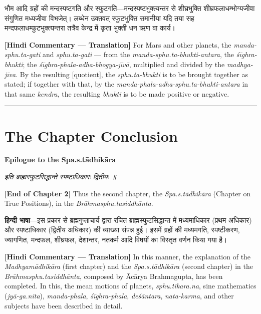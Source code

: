 \documentclass[11pt,a4paper]{book}
\newcommand{\dev}[1]{{\devanagarifont #1}}
\newcommand{\shlokabilingual}[2]{%
  \par\vspace{0.8em}%
  \noindent\begin{minipage}[t]{0.48\textwidth}
    \RaggedRight
    \dev{\textit{#1}}
  \end{minipage}%
  \hfill
  \begin{minipage}[t]{0.48\textwidth}
    \RaggedRight
    #2%
  \end{minipage}%
  \par\vspace{0.8em}%
}
\newcommand{\hindicommbilingual}[2]{%
  \par\vspace{0.5em}%
  \noindent\begin{minipage}[t]{0.48\textwidth}
    \RaggedRight\small
    \dev{#1}
  \end{minipage}%
  \hfill
  \begin{minipage}[t]{0.48\textwidth}
    \RaggedRight\small
    #2%
  \end{minipage}%
  \par\vspace{0.5em}%
}
\newcommand{\ruleheadingbilingual}[2]{%
  \par\vspace{0.8em}%
  \noindent\begin{minipage}[t]{0.48\textwidth}
    \textbf{\color{sectioncolor}\dev{#1}}
  \end{minipage}%
  \hfill
  \begin{minipage}[t]{0.48\textwidth}
    \textbf{\color{sectioncolor}#2}
  \end{minipage}%
  \par\vspace{0.4em}%
}
\newcommand{\secdivider}{%
  \begin{center}\rule{0.4\textwidth}{0.5pt}\end{center}%
}
\begin{document}
\hindicommbilingual{%
भौम आदि ग्रहों की मन्दस्पष्टगति और स्फुटगति---मन्दस्पष्टभुक्त्यन्तर से शीघ्रभुक्ति शीघ्रफलाधम्भोग्यजीवा संगुणित मध्यजीवा विभजेत्‌। लब्धेन उक्तवत्‌ स्फुटभुक्ति समानीया यदि तया सह मन्दफलाधम्फुटभुक्त्यन्तरा तत्रैव केन्द्र में कृता भुक्ती धन ऋण वा कार्य।
}{%
\textbf{[Hindi Commentary --- Translation]} For Mars and other planets, the \textit{manda-sphu.ta-gati} and \textit{sphu.ta-gati} --- from the \textit{manda-sphu.ta-bhukti-antara}, the \textit{śīghra-bhukti}; the \textit{śīghra-phala-adha-bhogya-jīvā}, multiplied and divided by the \textit{madhya-jīva}. By the resulting [quotient], the \textit{sphu.ta-bhukti} is to be brought together as stated; if together with that, by the \textit{manda-phala-adha-sphu.ta-bhukti-antara} in that same \textit{kendra}, the resulting \textit{bhukti} is to be made positive or negative.
}

\secdivider
\clearpage

\section{The Chapter Conclusion}

\ruleheadingbilingual{स्पष्टाधिकारोपसंहारः}{Epilogue to the Spa.s.tādhikāra}

\shlokabilingual{%
इति ब्राह्मस्फुटसिद्धान्ते स्पष्टाधिकारः द्वितीयः ॥
}{%
\textbf{[End of Chapter 2]} Thus the second chapter, the \textit{Spa.s.tādhikāra} (Chapter on True Positions), in the \textit{Brāhmasphu.tasiddhānta}.
}

\hindicommbilingual{%
\textbf{हिन्दी भाषा}---इस प्रकार से ब्रह्मगुप्ताचार्य द्वारा रचित ब्राह्मस्फुटसिद्धान्त में मध्यमाधिकार (प्रथम अधिकार) और स्पष्टाधिकार (द्वितीय अधिकार) की व्याख्या संपन्न हुई। इसमें ग्रहों की मध्यमगति, स्पष्टीकरण, ज्यागणित, मन्दफल, शीघ्रफल, देशान्तर, नतकर्म आदि विषयों का विस्तृत वर्णन किया गया है।
}{%
\textbf{[Hindi Commentary --- Translation]} In this manner, the explanation of the \textit{Madhyamādhikāra} (first chapter) and the \textit{Spa.s.tādhikāra} (second chapter) in the \textit{Brāhmasphu.tasiddhānta}, composed by Ācārya Brahmagupta, has been completed. In this, the mean motions of planets, \textit{sphu.tīkara.na}, sine mathematics (\textit{jyā-ga.nita}), \textit{manda-phala}, \textit{śīghra-phala}, \textit{deśāntara}, \textit{nata-karma}, and other subjects have been described in detail.
}

\vspace{1em}
\end{document}
